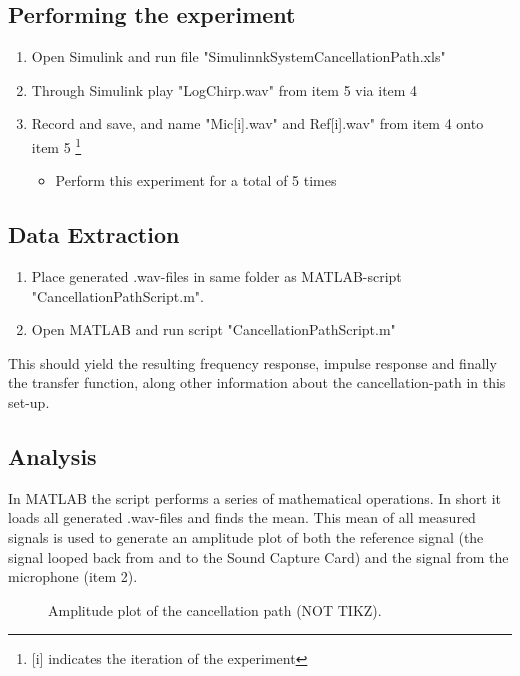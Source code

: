\subsection{Performing the experiment}
\begin{enumerate}
	\item Open Simulink\textsuperscript{\textregistered} and run file "SimulinnkSystemCancellationPath.xls"
	\item Through Simulink\textsuperscript{\textregistered} play "LogChirp.wav" from item 5 via item 4
	\item Record and save, and name "Mic[i].wav" and Ref[i].wav" from item 4 onto item 5 \footnote{[i] indicates the iteration of the experiment}
	\begin{itemize}
		\item[] Perform this experiment for a total of 5 times
	\end{itemize}
\end{enumerate}


\subsection{Data Extraction}
\begin{enumerate}
	\item Place generated .wav-files in same folder as MATLAB\textsuperscript{\textregistered}-script "CancellationPathScript.m".
	\item Open MATLAB\textsuperscript{\textregistered} and run script "CancellationPathScript.m"
\end{enumerate}
This should yield the resulting frequency response, impulse response and finally the transfer function, along other information about the cancellation-path in this set-up.

\subsection{Analysis}
In MATLAB\textsuperscript{\textregistered} the script performs a series of mathematical operations. In short it loads all generated .wav-files and finds the mean. This mean of all measured signals is used to generate an amplitude plot of both the reference signal (the signal looped back from and to the Sound Capture Card) and the signal from the microphone (item 2).

\begin{figure}[H]
	\centering
	
	\caption{Amplitude plot of the cancellation path (NOT TIKZ).}
	\label{AmplitudePlotCancellationPath}
\end{figure}

